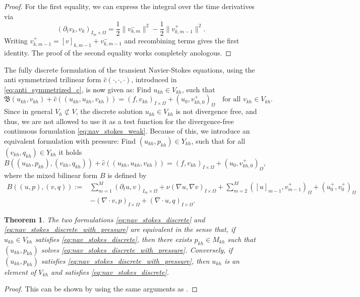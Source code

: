 \documentclass{m2an}
\newcommand\blue[1]{\textcolor{black}{#1}}
\newtheorem{theorem}{Theorem}[section]
\newcommand{\IOprod}[1]{\left( #1 \right)_{I\times\Omega}}
\newcommand{\ImOprod}[1]{\left( #1 \right)_{I_m\times\Omega}}
\newcommand{\Oprod}[1]{\left( #1 \right)_{\Omega}}
\newcommand{\chatO}[1]{\hat c\left( #1 \right)}
\newcommand{\chatIO}[1]{\hat c \left(\!\left( #1 \right)\!\right)}
\newcommand{\Vkh}{V_{kh}}
\newcommand{\Mkh}{M_{kh}}
\newcommand{\Xkh}{Y_{kh}}
\newcommand{\ukh}{u_{kh}}
\newcommand{\vkh}{v_{kh}}
\newcommand{\vk}{v_{k}}
\newcommand{\pkh}{p_{kh}}
\newcommand{\qkh}{q_{kh}}
\begin{document}
\begin{proof}
  For the first equality, we can express the integral over the time derivatives via
  \begin{equation*}
   \ImOprod{\partial_t \vk,\vk} =  \frac{1}{2} \|v_{k,m}^-\|^2 - \frac{1}{2} \|v_{k,m-1}^+\|^2.
  \end{equation*}
  Writing $v_{k,m-1}^+ = [v]_{k,m-1} + v_{k,m-1}^-$ and recombining terms gives the first identity.
  The proof of the second equality works completely anologous.
\end{proof}
The fully discrete formulation of the transient Navier-Stokes equations, using the anti symmetrized trilinear 
form $\chatO{\cdot,\cdot,\cdot}$, introduced in \eqref{eq:anti_symmetrized_c}, is \blue{now} given as:
Find $\ukh \in \Vkh$, such that 
\begin{equation}\label{eq:nav_stokes_discrete}
  \mathfrak B (\ukh,\vkh) + \chatIO{\ukh,\ukh,\vkh} = \IOprod{f,\vkh} + \Oprod{u_0,v_{kh,0}^+} 
  \quad \text{for all } \vkh \in \Vkh.
\end{equation}
Since in general $V_h \not \subset V$, the discrete solution $\ukh \in \Vkh$ is not divergence free,
and thus, we are not allowed to 
use it as a test function for the divergence-free continuous formulation \eqref{eq:nav_stokes_weak}.
Because of this, we introduce an equivalent formulation with pressure:
Find $(\ukh,\pkh) \in \Xkh$, such that for all $(\vkh,\qkh) \in \Xkh$
it holds
\begin{equation}\label{eq:nav_stokes_discrete_with_pressure}
  B((\ukh,\pkh),(\vkh,\qkh)) + \chatIO{\ukh,\ukh,\vkh} = \IOprod{f,\vkh} + \Oprod{u_0,v_{kh,0}^+},
\end{equation}
where the mixed bilinear form $B$ is defined by
\begin{align*}
  B ((u,p),(v,q)) := & \sum_{m=1}^M \ImOprod{\partial_t u, v} + \nu\IOprod{\nabla u, \nabla v}
  + \sum_{m=2}^M \Oprod{[u]_{m-1},v^+_{m-1}} + \Oprod{u_0^+,v_0^+} \\
                    & - \IOprod{\nabla \cdot v, p} + \IOprod{\nabla \cdot u, q}.
\end{align*}
\begin{theorem}
  The two formulations \eqref{eq:nav_stokes_discrete} and \eqref{eq:nav_stokes_discrete_with_pressure}
  are equivalent in the sense that, if $\ukh \in \Vkh$ satisfies 
  \eqref{eq:nav_stokes_discrete}, then there exists $\pkh \in \Mkh$ such that 
  $(\ukh,\pkh)$ solves \eqref{eq:nav_stokes_discrete_with_pressure}.
  Conversely, if $(\ukh,\pkh)$ satisfies \eqref{eq:nav_stokes_discrete_with_pressure},
  then $\ukh$ is an element of $\Vkh$ and satisfies \eqref{eq:nav_stokes_discrete}.
\end{theorem}
\begin{proof}
  This can be shown by using the same arguments as \cite[Proposition 4.3]{behringer_fully_2022}.
\end{proof}
\end{document}
